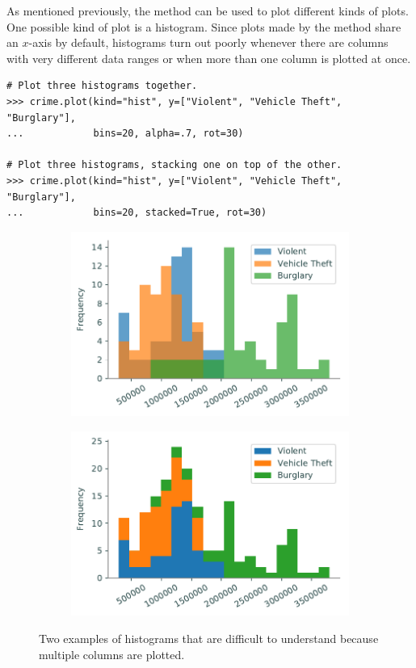 As mentioned previously, the  method can be used to plot different kinds of plots.
One possible kind of plot is a histogram.
Since plots made by the  method share an $x$-axis by default, histograms turn out poorly whenever there are columns with very different data ranges or when more than one column is plotted at once.

\begin{lstlisting}
# Plot three histograms together.
>>> crime.plot(kind="hist", y=["Violent", "Vehicle Theft", "Burglary"],
...            bins=20, alpha=.7, rot=30)

# Plot three histograms, stacking one on top of the other.
>>> crime.plot(kind="hist", y=["Violent", "Vehicle Theft", "Burglary"],
...            bins=20, stacked=True, rot=30)
\end{lstlisting}

\begin{figure}[H] %
\centering
\begin{subfigure}{.49\textwidth}
    \includegraphics[width=\textwidth]{figures/bad_hist_unstacked.pdf}
\end{subfigure}
%
\begin{subfigure}{.49\textwidth}
    \includegraphics[width=\textwidth]{figures/bad_hist_stacked.pdf}
\end{subfigure}
\caption{Two examples of histograms that are difficult to understand because multiple columns are plotted.}
\end{figure}

